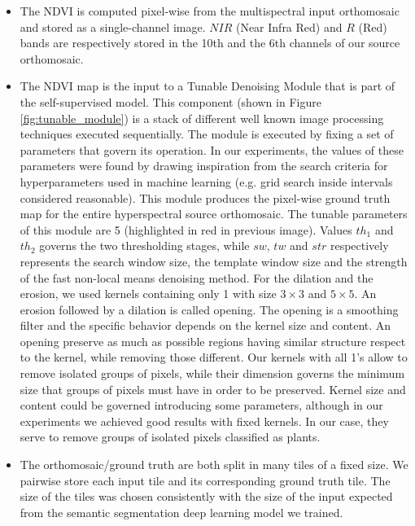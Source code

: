 \documentclass[comsoc,final]{IEEEtran}
\begin{document}
\begin{itemize}
    \item The NDVI is computed pixel-wise from the multispectral input orthomosaic and stored as a single-channel image. 
    $NIR$ (Near Infra Red) and $R$ (Red) bands are respectively stored in the 10th and the 6th channels of our source orthomosaic.
    \item The NDVI map is the input to a Tunable Denoising Module that is part of the self-supervised model. This component (shown in Figure \ref{fig:tunable_module}) is a stack of different well known image processing techniques executed sequentially. 
    The module is executed by fixing a set of parameters that govern its operation. In our experiments, the values of these parameters were found by drawing inspiration from the search criteria for hyperparameters used in machine learning (e.g. grid search inside intervals considered reasonable).
    This module produces the pixel-wise ground truth map for the entire hyperspectral source orthomosaic. The tunable parameters of this module are 5 (highlighted in red in previous image). Values $th_1$ and $th_2$ governs the two thresholding stages, while $sw$, $tw$ and $str$ respectively represents the search window size, the template window size and the strength of the fast non-local means denoising method. For the dilation and the erosion, we used kernels containing only 1 with size $3\times3$ and $5\times5$.
    An erosion followed by a dilation is called opening. The opening is a smoothing filter and the specific behavior depends on the kernel size and content. An opening preserve as much as possible regions having similar structure respect to the kernel, while removing those different. Our kernels with all 1's allow to remove isolated groups of pixels, while their dimension governs the minimum size that groups of pixels must have in order to be preserved. Kernel size and content could be governed introducing some parameters, although in our experiments we achieved good results with fixed kernels.
    In our case, they serve to remove groups of isolated pixels classified as plants.
    \item The orthomosaic/ground truth are both split in many tiles of a fixed size. We pairwise store each input tile and its corresponding ground truth tile. The size of the tiles was chosen consistently with the size of the input expected from the semantic segmentation deep learning model we trained.
\end{itemize}
\end{document}
